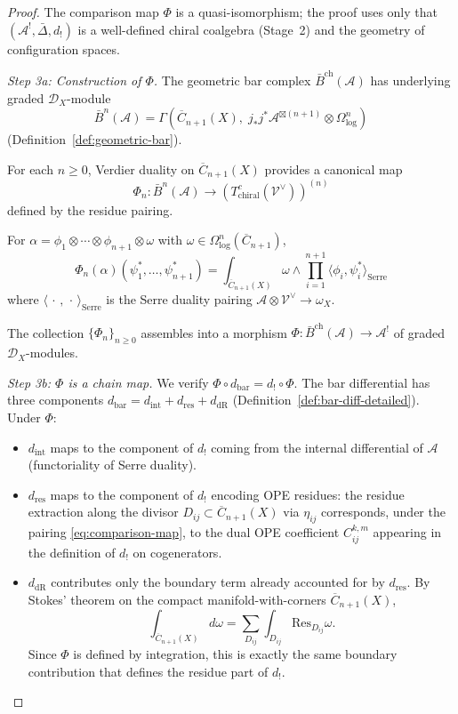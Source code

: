 \begin{proof}
The comparison map $\Phi$ is a quasi-isomorphism; the proof uses only that $(\mathcal{A}^!, \bar\Delta, d_!)$ is a well-defined chiral coalgebra (Stage~2) and the geometry of configuration spaces.

\emph{Step 3a: Construction of $\Phi$.}  The geometric bar complex $\bar{B}^{\mathrm{ch}}(\mathcal{A})$ has underlying graded $\mathcal{D}_X$-module
\[\bar{B}^n(\mathcal{A}) = \Gamma\!\left(\overline{C}_{n+1}(X),\; j_*j^*\mathcal{A}^{\boxtimes(n+1)} \otimes \Omega^n_{\log}\right)\]
(Definition~\ref{def:geometric-bar}).

For each $n \geq 0$, Verdier duality on $\overline{C}_{n+1}(X)$ provides a canonical map
\[\Phi_n \colon \bar{B}^n(\mathcal{A}) \longrightarrow (T^c_{\mathrm{chiral}}(\mathcal{V}^{\vee}))^{(n)}\]
defined by the residue pairing.

For $\alpha = \phi_1 \otimes \cdots \otimes \phi_{n+1} \otimes \omega$ with $\omega \in \Omega^n_{\log}(\overline{C}_{n+1})$,
\begin{equation}\label{eq:comparison-map}
\Phi_n(\alpha)(\psi_1^*, \ldots, \psi_{n+1}^*) = \int_{\overline{C}_{n+1}(X)} \omega \wedge \prod_{i=1}^{n+1} \langle \phi_i, \psi_i^* \rangle_{\mathrm{Serre}}
\end{equation}
where $\langle\,\cdot\,,\,\cdot\,\rangle_{\mathrm{Serre}}$ is the Serre duality pairing $\mathcal{A} \otimes \mathcal{V}^{\vee} \to \omega_X$.

The collection $\{\Phi_n\}_{n \geq 0}$ assembles into a morphism $\Phi \colon \bar{B}^{\mathrm{ch}}(\mathcal{A}) \to \mathcal{A}^!$ of graded $\mathcal{D}_X$-modules.

\emph{Step 3b: $\Phi$ is a chain map.}  We verify
$\Phi \circ d_{\mathrm{bar}} = d_! \circ \Phi$.  The bar differential
has three components
$d_{\mathrm{bar}} = d_{\mathrm{int}} + d_{\mathrm{res}} + d_{\mathrm{dR}}$
(Definition~\ref{def:bar-diff-detailed}).  Under $\Phi$:
\begin{itemize}
\item $d_{\mathrm{int}}$ maps to the component of $d_!$ coming from the internal differential of $\mathcal{A}$ (functoriality of Serre duality).
\item $d_{\mathrm{res}}$ maps to the component of $d_!$ encoding OPE residues: the residue extraction along the divisor $D_{ij} \subset \overline{C}_{n+1}(X)$ via $\eta_{ij}$ corresponds, under the pairing \eqref{eq:comparison-map}, to the dual OPE coefficient $C_{ij}^{k,m}$ appearing in the definition of $d_!$ on cogenerators.
\item $d_{\mathrm{dR}}$ contributes only the boundary term already
accounted for by $d_{\mathrm{res}}$.  By Stokes' theorem on the compact
manifold-with-corners $\overline{C}_{n+1}(X)$,
\[
\int_{\overline{C}_{n+1}(X)} d\omega
= \sum_{D_{ij}} \int_{D_{ij}} \mathrm{Res}_{D_{ij}} \omega.
\]
Since $\Phi$ is defined by integration, this is exactly the same
boundary contribution that defines the residue part of $d_!$.
\end{itemize}


\end{proof}
